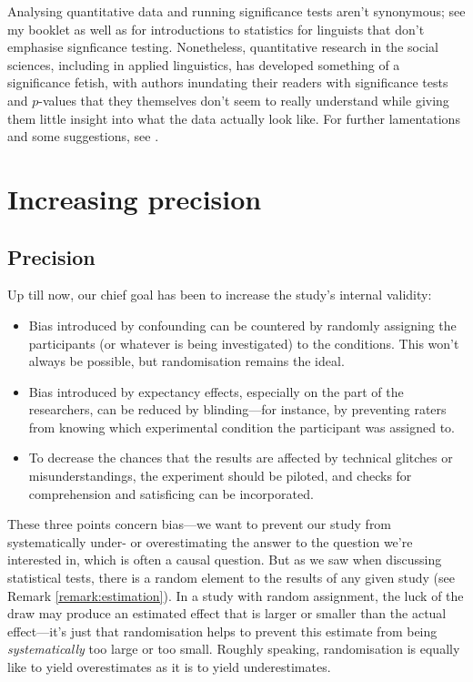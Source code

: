 \documentclass[a4paper]{tufte-book}\usepackage[]{graphicx}\usepackage[]{xcolor}
\begin{document}
Analysing quantitative data and running significance tests aren't
synonymous; see my booklet as well as \citet{Winter2019} for introductions
to statistics for linguists that don't emphasise signficance testing.
Nonetheless, quantitative research in the social sciences, including in applied
linguistics, has developed something of a significance fetish,
with authors inundating their readers with significance tests and $p$-values
that they themselves don't seem to really understand while giving them
little insight into what the data actually look like.
For further lamentations and some
suggestions, see \citet{Vanhove2020b}.




\chapter{Increasing precision}\label{ch:precision}

\section{Precision}

Up till now, our chief goal has been to increase the study's
internal validity:
\begin{itemize}
  \item Bias introduced by confounding can be countered by randomly
  assigning the participants (or whatever is being investigated) to
  the conditions. This won't always be possible, but randomisation
  remains the ideal.
  
  \item Bias introduced by expectancy effects, especially on the part
  of the researchers, can be reduced by blinding---for instance,
  by preventing raters from knowing which experimental condition
  the participant was assigned to.
  
  \item To decrease the chances that the results are affected by
  technical glitches or misunderstandings, 
  the experiment should be piloted,
  and checks for comprehension and satisficing can be incorporated.
  
\end{itemize}

\medskip

These three points concern bias---we want to prevent our
study from systematically under- or overestimating the answer to
the question we're interested in, which is often a causal question. 
But as we saw when discussing
statistical tests, there is a random element to the results of any
given study (see Remark \vref{remark:estimation}). 
In a study with random assignment, the luck of the draw
may produce an estimated effect that is larger or smaller than the actual
effect---it's just that randomisation helps to prevent
this estimate from being \emph{systematically} too large or too small.
Roughly speaking, randomisation is equally like to yield overestimates as it is
to yield underestimates.
\end{document}
